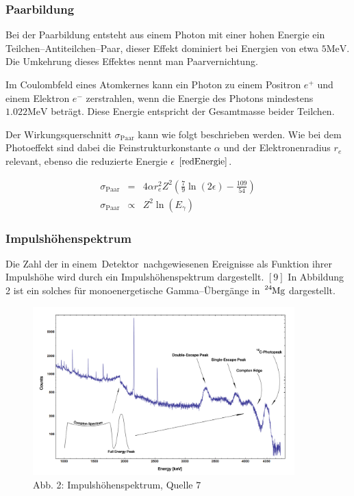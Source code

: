 \documentclass[12pt,a4paper]{scrartcl}
\numberwithin{equation}{section} %
\newcommand{\pu}[1]{\ensuremath{\mathrm{#1}}}
\renewcommand{\[}{} %
\renewcommand{\]}{\noindent} %
\begin{document}
\hypertarget{paarbildung}{%
\subsubsection{Paarbildung}\label{paarbildung}}

Bei der Paarbildung entsteht aus einem Photon mit einer hohen Energie
ein Teilchen--Antiteilchen--Paar, dieser Effekt dominiert bei Energien
von etwa \(\pu{5 MeV}\). Die Umkehrung dieses Effektes nennt man
Paarvernichtung.

Im Coulombfeld eines Atomkernes kann ein Photon zu einem Positron
\(e^+\) und einem Elektron \(e^-\) zerstrahlen, wenn die Energie des
Photons mindestens \(\pu{1.022 MeV}\) beträgt. Diese Energie entspricht
der Gesamtmasse beider Teilchen.

Der Wirkungsquerschnitt \(\sigma_\mathrm{Paar}\) kann wie folgt
beschrieben werden. Wie bei dem Photoeffekt sind dabei die
Feinstrukturkonstante \(\alpha\) und der Elektronenradius \(r_e\)
relevant, ebenso die reduzierte Energie \(\epsilon\)
\(\eqref{redEnergie}\).

\[
\begin{eqnarray}
    \sigma_\mathrm{Paar}
        &=& 4\alpha r_e^2 Z^2
            \left(\frac{7}{9} \ln(2\epsilon) - \frac{109}{54} \right) \\
    \sigma_\mathrm{Paar}
        &\propto& Z^2 \ln(E_\gamma)
\end{eqnarray}
\]

\hypertarget{impulshuxf6henspektrum}{%
\subsubsection{Impulshöhenspektrum}\label{impulshuxf6henspektrum}}

Die Zahl der in einem~Detektor~nachgewiesenen Ereignisse als Funktion
ihrer Impulshöhe wird durch ein Impulshöhenspektrum dargestellt. \([9]\)
In Abbildung 2 ist ein solches für monoenergetische Gamma--Übergänge in
\(\ce{^{24}Mg}\) dargestellt.

\begin{figure}
	\centering
	\includegraphics[width=0.9\textwidth]{../media/B3.4/Am_Be_SourceSpectrum.jpg}
	\caption{Abb. 2: Impulshöhenspektrum, Quelle \(7\)}
	\label{abb:Impulshoehenspektrum}
\end{figure}
\end{document}

